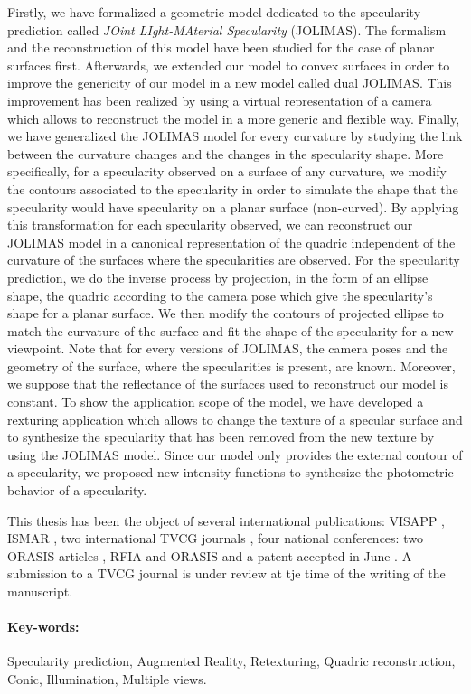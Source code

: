 Firstly, we have formalized a geometric model dedicated to the specularity prediction called \textit{JOint LIght-MAterial Specularity} (JOLIMAS). The formalism and the reconstruction of this model have been studied for the case of planar surfaces first. Afterwards, we extended our model to convex surfaces in order to improve the genericity of our model in a new model called dual JOLIMAS. This improvement has been realized by using a virtual representation of a camera which allows to reconstruct the model in a more generic and flexible way. Finally, we have generalized the \mbox{JOLIMAS} model for every curvature by studying the link between the curvature changes and the changes in the specularity shape. More specifically, for a specularity observed on a surface of any curvature, we modify the contours associated to the specularity in order to simulate the shape that the specularity would have specularity on a planar surface (non-curved). By applying this transformation for each specularity observed, we can reconstruct our JOLIMAS model in a canonical representation of the quadric independent of the curvature of the surfaces where the specularities are observed. For the specularity prediction, we do the inverse process by projection, in the form of an ellipse shape, the quadric according to the camera pose which give the specularity's shape for a planar surface. We then modify the contours of projected ellipse to match the curvature of the surface and fit the shape of the specularity for a new viewpoint.
Note that for every versions of JOLIMAS, the camera poses and the geometry of the surface, where the specularities is present, are known. Moreover, we suppose that the reflectance of the surfaces used to reconstruct our model is constant.   To show the application scope of the model, we have developed a rexturing application which allows to change the texture of a specular surface and to synthesize the specularity that has been removed from the new texture by using the JOLIMAS model. Since our model only provides the external contour of a specularity, we proposed new intensity functions to synthesize the photometric behavior of a specularity.

This thesis has been the object of several international publications: VISAPP \citeyearpar{morgand2014generic}, ISMAR \citeyearpar{morgand2016empirical, morgand2017multipleview}, two international TVCG journals \citeyearpar{morgand2017amultiple, morgand2017multiple}, four national conferences: two ORASIS articles \citeyearpar{morgand2015reconstruction, morgand2015detection}, RFIA \citeyearpar{morgand2015modele} and ORASIS \citeyearpar{morgand2017modele} and a patent accepted in June \citeyearpar{tamaazousti2018method}. A submission to a TVCG journal is under review at tje time of the writing of the manuscript.

\paragraph{Key-words:} Specularity prediction, Augmented Reality, Retexturing, Quadric reconstruction, Conic, Illumination, Multiple views.

